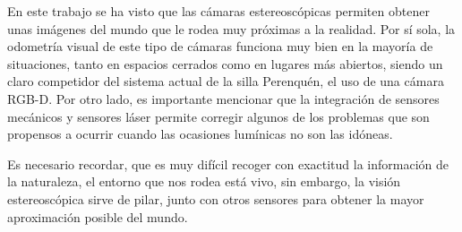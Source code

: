 

En este trabajo se ha visto que las cámaras estereoscópicas permiten obtener
unas imágenes del mundo que le rodea muy próximas a la realidad. Por sí sola, la
odometría visual de este tipo de cámaras funciona muy bien en la mayoría de
situaciones, tanto en espacios cerrados como en lugares más abiertos, siendo un
claro competidor del sistema actual de la silla Perenquén, el uso de una cámara
RGB-D. Por otro lado, es importante mencionar que la integración de sensores
mecánicos y sensores láser permite corregir algunos de los problemas que son
propensos a ocurrir cuando las ocasiones lumínicas no son las idóneas.

Es necesario recordar, que es muy difícil recoger con exactitud la información
de la naturaleza, el entorno que nos rodea está vivo, sin embargo, la visión
estereoscópica sirve de pilar, junto con otros sensores para obtener la mayor
aproximación posible del mundo.

